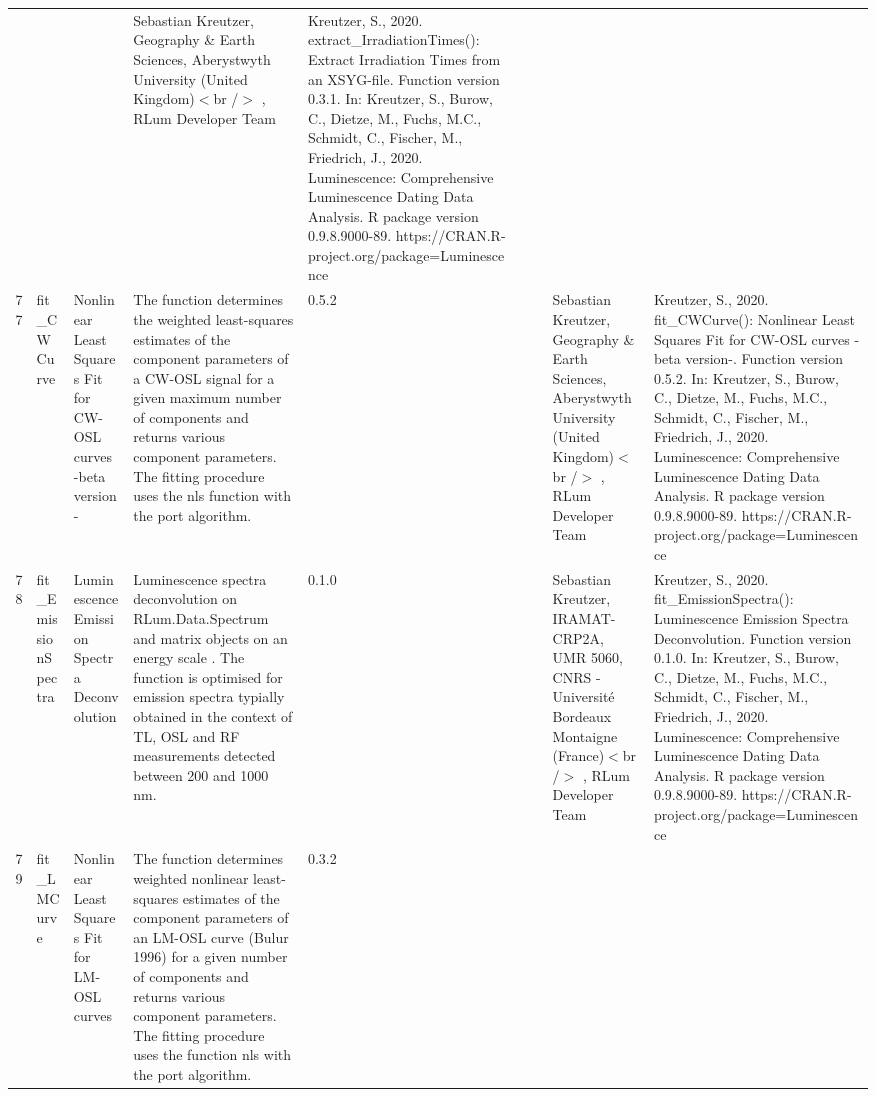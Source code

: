 \begin{table}[ht]
\begin{tabular}{rllllllll}
 &  &  & Sebastian Kreutzer, Geography \& Earth Sciences, Aberystwyth University (United Kingdom)$<$br /$>$ , RLum Developer Team & Kreutzer, S., 2020. extract\_IrradiationTimes(): Extract Irradiation Times from an XSYG-file. Function version 0.3.1. In: Kreutzer, S., Burow, C., Dietze, M., Fuchs, M.C., Schmidt, C., Fischer, M., Friedrich, J., 2020. Luminescence: Comprehensive Luminescence Dating Data Analysis. R package version 0.9.8.9000-89. https://CRAN.R-project.org/package=Luminescence
 \\ 
  77 & fit\_CWCurve & Nonlinear Least Squares Fit for CW-OSL curves -beta version- & The function determines the weighted least-squares estimates of the component parameters of a CW-OSL signal for a given maximum number of components and returns various component parameters. The fitting procedure uses the  nls  function with the  port  algorithm. & 0.5.2
 &  &  & Sebastian Kreutzer, Geography \& Earth Sciences, Aberystwyth University (United Kingdom)$<$br /$>$ , RLum Developer Team & Kreutzer, S., 2020. fit\_CWCurve(): Nonlinear Least Squares Fit for CW-OSL curves -beta version-. Function version 0.5.2. In: Kreutzer, S., Burow, C., Dietze, M., Fuchs, M.C., Schmidt, C., Fischer, M., Friedrich, J., 2020. Luminescence: Comprehensive Luminescence Dating Data Analysis. R package version 0.9.8.9000-89. https://CRAN.R-project.org/package=Luminescence
 \\ 
  78 & fit\_EmissionSpectra & Luminescence Emission Spectra Deconvolution & Luminescence spectra deconvolution on  RLum.Data.Spectrum  and  matrix  objects on an  energy scale . The function is optimised for emission spectra typially obtained in the context of TL, OSL and RF measurements detected between 200 and 1000 nm. & 0.1.0
 &  &  & Sebastian Kreutzer, IRAMAT-CRP2A, UMR 5060, CNRS - Université Bordeaux Montaigne (France)$<$br /$>$ , RLum Developer Team & Kreutzer, S., 2020. fit\_EmissionSpectra(): Luminescence Emission Spectra Deconvolution. Function version 0.1.0. In: Kreutzer, S., Burow, C., Dietze, M., Fuchs, M.C., Schmidt, C., Fischer, M., Friedrich, J., 2020. Luminescence: Comprehensive Luminescence Dating Data Analysis. R package version 0.9.8.9000-89. https://CRAN.R-project.org/package=Luminescence
 \\ 
  79 & fit\_LMCurve & Nonlinear Least Squares Fit for LM-OSL curves & The function determines weighted nonlinear least-squares estimates of the component parameters of an LM-OSL curve (Bulur 1996) for a given number of components and returns various component parameters. The fitting procedure uses the function  nls  with the  port  algorithm. & 0.3.2

\end{tabular}
\end{table}
